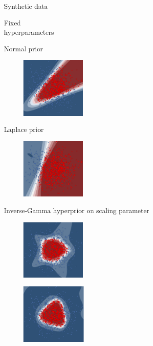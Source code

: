 \documentclass{beamer}
\begin{document}
\begin{frame}{Synthetic data}
	\begin{minipage}[t]{0.32\columnwidth}
	\vspace{0.7cm}
	Fixed \\ hyperparameters
	\end{minipage}
	\begin{minipage}[t]{0.32\columnwidth}
		\centering 
		Normal prior
		\begin{figure}
			\includegraphics[height=3cm]{pres_pics/p_gauss.png}
		\end{figure}
	\end{minipage}
	\begin{minipage}[t]{0.32\columnwidth}
		\centering
		Laplace prior
		\begin{figure}
			\includegraphics[height=3cm]{pres_pics/p_laplace.png}
		\end{figure}
	\end{minipage}
	
	\begin{minipage}[t]{0.32\columnwidth}
		\vspace{0.2cm}
		Inverse-Gamma hyperprior on scaling parameter
	\end{minipage}
	\begin{minipage}[t]{0.32\columnwidth}
		\begin{figure}
			\includegraphics[height=3cm]{pres_pics/h_gauss.png}
		\end{figure}
	\end{minipage}
	\begin{minipage}[t]{0.32\columnwidth}
		\begin{figure}
			\includegraphics[height=3cm]{pres_pics/h_laplace.png}
		\end{figure}
	\end{minipage}
\end{frame} 
\end{document}
